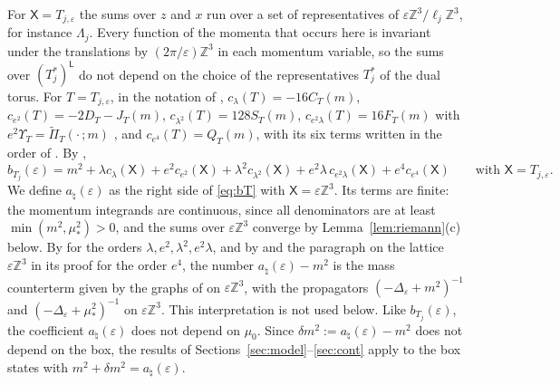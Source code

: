 \documentclass[11pt]{amsart}
\theoremstyle{plain}
\theoremstyle{definition}
\theoremstyle{remark}
\numberwithin{equation}{section}
\newcommand{\Z}{\mathbb{Z}}
\newcommand{\eps}{\varepsilon}
\begin{document}
For $\mathsf X=T_{j,\eps}$ the sums over $z$ and $x$ run over a set of representatives of $\eps\Z^3/\ell_j\Z^3$, for instance $\Lambda_j$. Every function of the momenta that occurs here is invariant under the translations by $(2\pi/\eps)\Z^3$ in each momentum variable, so the sums over $(T_j^*)^{\mathsf L}$ do not depend on the choice of the representatives $T_j^*$ of the dual torus. For $T=T_{j,\eps}$, in the notation of \cite[App.~G]{v1}, $c_\lambda(T)=-16C_T(m)$, $c_{e^2}(T)=-2D_T-J_T(m)$, $c_{\lambda^2}(T)=128S_T(m)$, $c_{e^2\lambda}(T)=16F_T(m)$ with $e^2\Upsilon_T=\widetilde\Pi_T(\cdot\,;m)$ \cite[Lemma~G.16]{v1}, and $c_{e^4}(T)=Q_T(m)$, with its six terms written in the order of \cite[Cor.~G.22]{v1}. By \cite[Def.~2.2 and Lemma~G.1]{v1},
\begin{equation}\label{eq:bT}
b_{T_j}(\eps)=m^2+\lambda c_\lambda(\mathsf X)+e^2c_{e^2}(\mathsf X)+\lambda^2c_{\lambda^2}(\mathsf X)+e^2\lambda\,c_{e^2\lambda}(\mathsf X)+e^4c_{e^4}(\mathsf X)\qquad\text{with }\mathsf X=T_{j,\eps}.
\end{equation}
We define $a_\natural(\eps)$ as the right side of \eqref{eq:bT} with $\mathsf X=\eps\Z^3$. Its terms are finite: the momentum integrands are continuous, since all denominators are at least $\min(m^2,\mu_*^2)>0$, and the sums over $\eps\Z^3$ converge by Lemma~\ref{lem:riemann}(c) below. By \cite[Lemma~G.16]{v1} for the orders $\lambda,e^2,\lambda^2,e^2\lambda$, and by \cite[Cor.~G.22]{v1} and the paragraph on the lattice $\eps\Z^3$ in its proof for the order $e^4$, the number $a_\natural(\eps)-m^2$ is the mass counterterm given by the graphs of \cite[(3.32)--(3.33), p.~659]{K1} on $\eps\Z^3$, with the propagators $(-\Delta_\eps+m^2)^{-1}$ and $(-\Delta_\eps+\mu_*^2)^{-1}$ on $\eps\Z^3$. This interpretation is not used below. Like $b_{T_j}(\eps)$, the coefficient $a_\natural(\eps)$ does not depend on $\mu_0$. Since $\delta m^2:=a_\natural(\eps)-m^2$ does not depend on the box, the results of Sections~\ref{sec:model}--\ref{sec:cont} apply to the box states with $m^2+\delta m^2=a_\natural(\eps)$.
\end{document}
